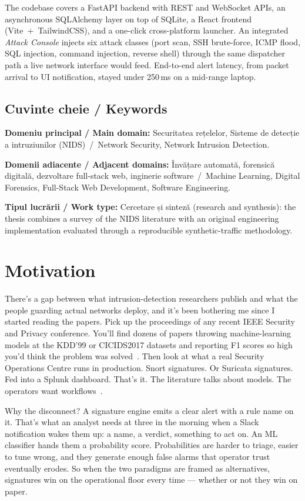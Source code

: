 The codebase covers a FastAPI backend with REST and WebSocket
APIs, an asynchronous SQLAlchemy layer on top of SQLite, a React
frontend (Vite~+~TailwindCSS), and a one-click cross-platform
launcher. An integrated \emph{Attack Console} injects six attack
classes (port scan, SSH brute-force, ICMP flood, SQL injection,
command injection, reverse shell) through the same dispatcher
path a live network interface would feed. End-to-end alert
latency, from packet arrival to UI notification, stayed under
250\,ms on a mid-range laptop.

\subsection*{Cuvinte cheie / Keywords}

\noindent\textbf{Domeniu principal / Main domain:}
Securitatea rețelelor, Sisteme de detecție a intruziunilor (NIDS)
\,/\, Network Security, Network Intrusion Detection.

\noindent\textbf{Domenii adiacente / Adjacent domains:}
Învățare automată, forensică digitală, dezvoltare full-stack web,
inginerie software \,/\, Machine Learning, Digital Forensics,
Full-Stack Web Development, Software Engineering.

\noindent\textbf{Tipul lucrării / Work type:}
Cercetare și sinteză (research and synthesis): the thesis
combines a survey of the NIDS literature with an original
engineering implementation evaluated through a reproducible
synthetic-traffic methodology.

\section{Motivation}
\label{sec:motivation}

There's a gap between what intrusion-detection researchers publish
and what the people guarding actual networks deploy, and it's been
bothering me since I started reading the papers. Pick up the
proceedings of any recent IEEE Security and Privacy conference.
You'll find dozens of papers throwing machine-learning models at
the KDD'99 or CICIDS2017 datasets and reporting F1 scores so high
you'd think the problem was solved~\cite{khraisat2019survey,
buczak2016survey}. Then look at what a real Security Operations
Centre runs in production. Snort signatures. Or Suricata
signatures. Fed into a Splunk dashboard. That's it. The literature
talks about models. The operators want
workflows~\cite{sommer2010outside}.

Why the disconnect? A signature engine emits a clear alert with
a rule name on it. That's what an analyst needs at three in the
morning when a Slack notification wakes them up: a name, a
verdict, something to act on. An ML classifier hands them a
probability score. Probabilities are harder to triage, easier
to tune wrong, and they generate enough false alarms that
operator trust eventually erodes. So when the two paradigms
are framed as alternatives, signatures win on the operational
floor every time --- whether or not they win on paper.


